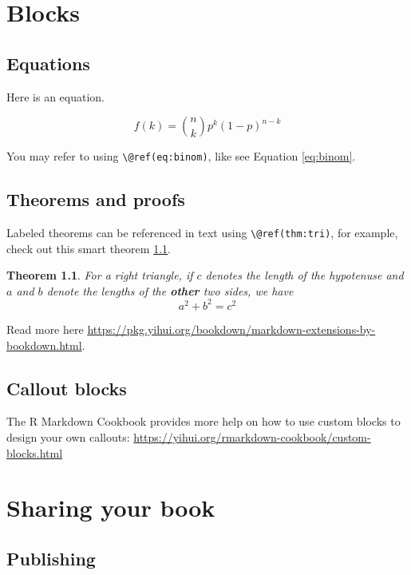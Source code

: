 \documentclass[
]{book}
\newtheorem{theorem}{Theorem}[chapter]
\theoremstyle{definition}
\theoremstyle{definition}
\theoremstyle{definition}
\theoremstyle{definition}
\theoremstyle{remark}
\begin{document}
\chapter{Blocks}\label{blocks}

\section{Equations}\label{equations}

Here is an equation.

\begin{equation} 
  f\left(k\right) = \binom{n}{k} p^k\left(1-p\right)^{n-k}
  \label{eq:binom}
\end{equation}

You may refer to using \texttt{\textbackslash{}@ref(eq:binom)}, like see Equation \eqref{eq:binom}.

\section{Theorems and proofs}\label{theorems-and-proofs}

Labeled theorems can be referenced in text using \texttt{\textbackslash{}@ref(thm:tri)}, for example, check out this smart theorem \ref{thm:tri}.

\begin{theorem}
\protect\hypertarget{thm:tri}{}\label{thm:tri}For a right triangle, if \(c\) denotes the \emph{length} of the hypotenuse
and \(a\) and \(b\) denote the lengths of the \textbf{other} two sides, we have
\[a^2 + b^2 = c^2\]
\end{theorem}

Read more here \url{https://pkg.yihui.org/bookdown/markdown-extensions-by-bookdown.html}.

\section{Callout blocks}\label{callout-blocks}

The R Markdown Cookbook provides more help on how to use custom blocks to design your own callouts: \url{https://yihui.org/rmarkdown-cookbook/custom-blocks.html}

\chapter{Sharing your book}\label{sharing-your-book}

\section{Publishing}\label{publishing}
\end{document}

